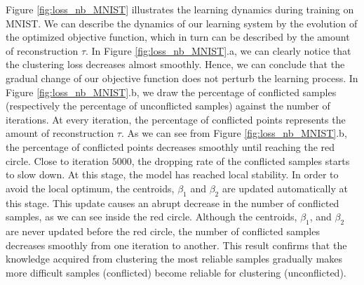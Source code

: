 \documentclass{article}
\begin{document}
Figure \ref{fig:loss_nb_MNIST} illustrates the learning dynamics during training on MNIST. We can describe the dynamics of our learning system by the evolution of the optimized objective function, which in turn can be described by the amount of reconstruction $\tau$. In Figure \ref{fig:loss_nb_MNIST}.a, we can clearly notice that the clustering loss decreases almost smoothly. Hence, we can conclude that the gradual change of our objective function does not perturb the learning process. In Figure \ref{fig:loss_nb_MNIST}.b, we draw the percentage of conflicted samples (respectively the percentage of unconflicted samples) against the number of iterations. At every iteration, the percentage of conflicted points represents the amount of reconstruction $\tau$. As we can see from Figure \ref{fig:loss_nb_MNIST}.b, the percentage of conflicted points decreases smoothly until reaching the red circle. Close to iteration $5000$, the dropping rate of the conflicted samples starts to slow down. At this stage, the model has reached local stability. In order to avoid the local optimum, the centroids, $\beta_{1}$ and $\beta_{2}$ are updated automatically at this stage. This update causes an abrupt decrease in the number of conflicted samples, as we can see inside the red circle. Although the centroids, $\beta_{1}$, and $\beta_{2}$ are never updated before the red circle, the number of conflicted samples decreases smoothly from one iteration to another. This result confirms that the knowledge acquired from clustering the most reliable samples gradually makes more difficult samples (conflicted) become reliable for clustering (unconflicted).



\begin{figure*}[ht]
\vskip 0.2in
\centering
    \caption{Learning dynamics during training on MNIST.}
\label{fig:loss_nb_MNIST}
\end{figure*}
\end{document}
